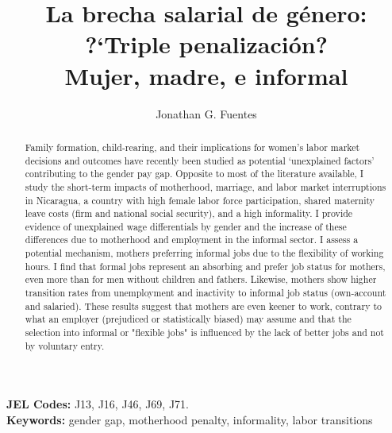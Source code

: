 \documentclass[a4paper]{article}
\title{La brecha salarial de género: ?`Triple penalización? \\Mujer, madre, e informal}
\author{Jonathan G. Fuentes}
\numberwithin{table}{section}
\begin{document}
\begin{titlepage}
\singlespacing
\maketitle
\begin{abstract}
	Family formation, child-rearing, and their implications for women's labor market decisions and outcomes have recently been studied as potential `unexplained factors' contributing to the gender pay gap. Opposite to most of the literature available, I study the short-term impacts of motherhood, marriage, and labor market interruptions in Nicaragua, a country with high female labor force participation, shared maternity leave costs (firm and national social security), and a high informality. I provide evidence of unexplained wage differentials by gender and the increase of these differences due to motherhood and employment in the informal sector. I assess a potential mechanism, mothers preferring informal jobs due to the flexibility of working hours. I find that formal jobs represent an absorbing and prefer job status for mothers, even more than for men without children and fathers. Likewise, mothers show higher transition rates from unemployment and inactivity to informal job status (own-account and salaried). These results suggest that mothers are even keener to work, contrary to what an employer (prejudiced or statistically biased) may assume and that the selection into informal or "flexible jobs" is influenced by the lack of better jobs and not by voluntary entry. 
\end{abstract}
\noindent\textbf{JEL Codes:} J13, J16, J46, J69, J71.	\\
\noindent\textbf{Keywords:} gender gap, motherhood penalty, informality, labor transitions \\
 

\end{titlepage}
\end{document}
